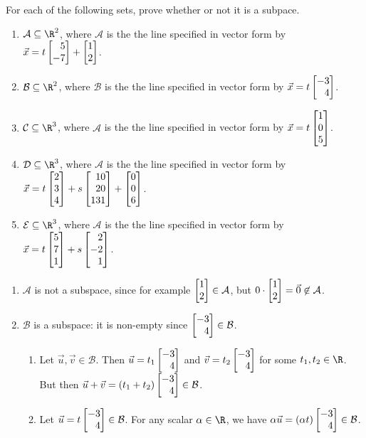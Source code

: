 \begin{exercises}
\begin{problist}
		\prob For each of the following sets, prove whether or not it is a subpace.
		\begin{enumerate}
			\item $\mathcal A \subseteq \R^2$, where $\mathcal A$ is the the line specified in vector form by
			$\vec x = t\mat{5\\-7}+\mat{1\\2}$.
			\item $\mathcal B \subseteq \R^2$, where $\mathcal B$ is  the the line specified  in vector form by
			$\vec x = t\mat{-3\\4}$.
			\item $\mathcal C \subseteq \R^3$, where $\mathcal A$ is  the the line specified  in vector form by
			$\vec x = t\mat{1\\0\\5}$.
			\item $\mathcal D \subseteq \R^3$, where $\mathcal A$ is  the the line specified  in vector form by
			$\vec x = t\mat{2\\3\\4}+s\mat{10\\20\\131}+\mat{0\\0\\6}$.
			\item $\mathcal E \subseteq \R^3$, where $\mathcal A$ is  the the line specified  in vector form by
			$\vec x = t\mat{5\\7\\1}+s\mat{2\\-2\\1}$.
		\end{enumerate}
		\begin{solution}
			\begin{enumerate}
				\item $\mathcal A$ is not a subspace, since for example $\mat{1\\2}\in\mathcal A$, 
					but $0\cdot\mat{1\\2}=\vec 0\not\in\mathcal A$.

				\item $\mathcal B$ is a subspace: it is non-empty since $\mat{-3\\4}\in\mathcal B$. 
				\begin{enumerate}
					\item Let $\vec u,\vec v\in \mathcal B$. Then $\vec u=t_1\mat{-3\\4}$ and $\vec v=t_2\mat{-3\\4}$ 
						for some $t_1,t_2\in\R$. But then $\vec u+\vec v=(t_1+t_2)\mat{-3\\4}\in \mathcal B$.
					\item Let $\vec u=t\mat{-3\\4}\in\mathcal B$. For any scalar $\alpha\in\R$, we have
						$\alpha\vec u=(\alpha t)\mat{-3\\4}\in\mathcal B$.
				\end{enumerate}


\end{enumerate}
\end{solution}
\end{problist}
\end{exercises}
